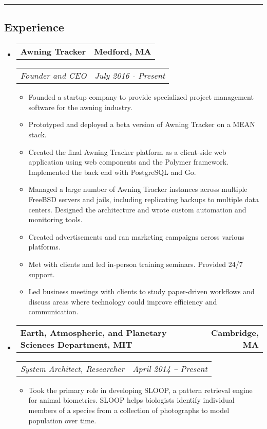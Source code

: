 \documentclass[10pt,letterpaper]{article}
\makeatletter
\newcommand{\headerrow}[2]
{\begin{tabular*}{\linewidth}{l@{\extracolsep{\fill}}r}
	#1 & #2 \\
\end{tabular*}}
\makeatother
\begin{document}
\hrule
\vspace{-0.4em}
\subsection*{Experience}
\begin{itemize}
	\parskip=0.1em

	\item
	\headerrow
		{\textbf{Awning Tracker}}
		{\textbf{Medford, MA}}
	\headerrow
		{\emph{Founder and CEO}}
        {\emph{July 2016 - Present}}
	\begin{itemize}
        \item Founded a startup company to provide specialized project
            management software for the awning industry.

        \item Prototyped and deployed a beta version of Awning Tracker on a
            MEAN stack.

        \item Created the final Awning Tracker platform as a client-side web
            application using web components and the Polymer framework.
            Implemented the back end with PostgreSQL and Go.

        \item Managed a large number of Awning Tracker instances across
            multiple FreeBSD servers and jails, including replicating backups
            to multiple data centers.  Designed the architecture and wrote
            custom automation and monitoring tools.

        \item Created advertisements and ran marketing campaigns across various
            platforms.

        \item Met with clients and led in-person training seminars.  Provided
            24/7 support.

        \item Led business meetings with clients to study paper-driven
            workflows and discuss areas where technology could improve
            efficiency and communication.
	\end{itemize}

    \item
    \headerrow
        {\textbf{Earth, Atmospheric, and Planetary Sciences Department, MIT}}
        {\textbf{Cambridge, MA}}
    \headerrow
        {\emph{System Architect, Researcher}}
        {\emph{April 2014 -- Present}}
    \begin{itemize}
        \item Took the primary role in developing SLOOP, a pattern retrieval
            engine for animal biometrics.  SLOOP helps biologists identify
            individual members of a species from a collection of photographs to
            model population over time.


\end{itemize}
\end{itemize}
\end{document}
